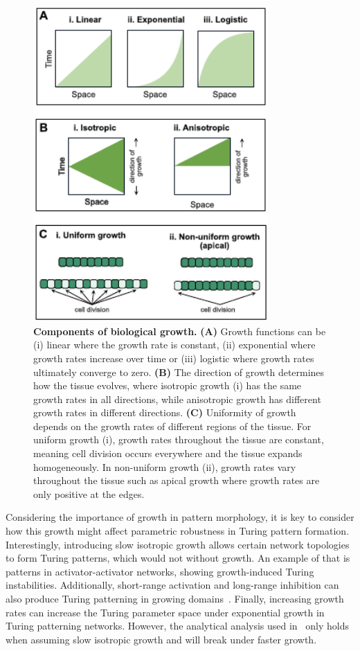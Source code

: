 \begin{figure}[h!]
    \centering
    \includegraphics[width=0.8\textwidth]{chapters/Introduction/growth}
    \caption{\textbf{Components of biological growth.} \textbf{(A)} Growth functions can be (i) linear where the growth rate is constant, (ii) exponential where growth rates increase over time or (iii) logistic where growth rates ultimately converge to zero. \textbf{(B)} The direction of growth determines how the tissue evolves, where isotropic growth (i) has the same growth rates in all directions, while anisotropic growth has different growth rates in different directions. \textbf{(C)} Uniformity of growth depends on the growth rates of different regions of the tissue. For uniform growth (i), growth rates throughout the tissue are constant, meaning cell division occurs everywhere and the tissue expands homogeneously. In non-uniform growth (ii), growth rates vary throughout the tissue such as apical growth where growth rates are only positive at the edges.}
    \label{fig:growth}
\end{figure}


Considering the importance of growth in pattern morphology, it is key to consider how this growth might affect parametric robustness in Turing pattern formation.
Interestingly, introducing slow isotropic growth allows certain network topologies to form Turing patterns, which would not without growth.
An example of that is patterns in activator-activator networks, showing growth-induced Turing instabilities.
Additionally, short-range activation and long-range inhibition can also produce Turing patterning in growing domains~\parencite{gaffney2010}.
Finally, increasing growth rates can increase the Turing parameter space under exponential growth in Turing patterning networks.
However, the analytical analysis used in~\cite{gaffney2010} only holds when assuming slow isotropic growth and will break under faster growth.

